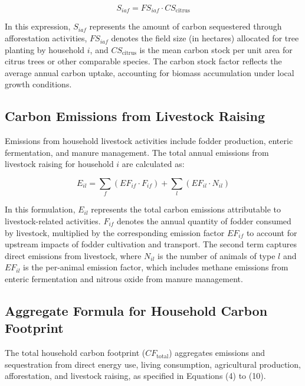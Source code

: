 \documentclass[12pt,a4paper]{article}%
\begin{document}
\begin{equation}
S_{iaf} = FS_{iaf} \cdot CS_{\text{citrus}}
\end{equation}

In this expression, $S_{iaf}$ represents the amount of carbon sequestered through afforestation activities, $FS_{iaf}$ denotes the field size (in hectares) allocated for tree planting by household $i$, and $CS_{\text{citrus}}$ is the mean carbon stock per unit area for citrus trees or other comparable species. The carbon stock factor reflects the average annual carbon uptake, accounting for biomass accumulation under local growth conditions.


\subsection{Carbon Emissions from Livestock Raising}

Emissions from household livestock activities include fodder production, enteric fermentation, and manure management. The total annual emissions from livestock raising for household $i$ are calculated as:

\begin{equation}
E_{il} = \sum_f (EF_{if} \cdot F_{if}) + \sum_l (EF_{il} \cdot N_{il})
\end{equation}

In this formulation, $E_{il}$ represents the total carbon emissions attributable to livestock-related activities. $F_{if}$ denotes the annual quantity of fodder consumed by livestock, multiplied by the corresponding emission factor $EF_{if}$ to account for upstream impacts of fodder cultivation and transport. The second term captures direct emissions from livestock, where $N_{il}$ is the number of animals of type $l$ and $EF_{il}$ is the per-animal emission factor, which includes methane emissions from enteric fermentation and nitrous oxide from manure management.



\subsection{Aggregate Formula for Household Carbon Footprint}

The total household carbon footprint ($CF_{\text{total}}$) aggregates emissions and sequestration from direct energy use, living consumption, agricultural production, afforestation, and livestock raising, as specified in Equations (4) to (10).
\end{document}
